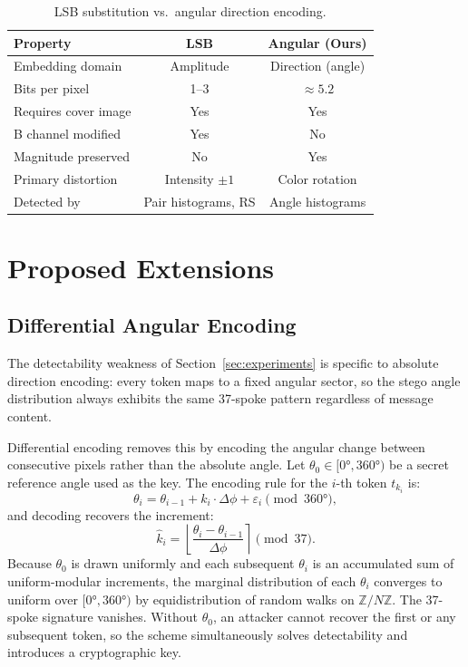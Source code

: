 \documentclass[12pt]{article}
\begin{document}
\begin{table}[H]
    \centering
    \caption{LSB substitution vs.\ angular direction encoding.}
    \label{tab:comparison}
    \begin{tabular}{lcc}
        \toprule
        \textbf{Property} & \textbf{LSB} & \textbf{Angular (Ours)} \\
        \midrule
        Embedding domain        & Amplitude       & Direction (angle) \\
        Bits per pixel          & 1--3            & $\approx 5.2$ \\
        Requires cover image    & Yes             & Yes \\
        B channel modified      & Yes             & No \\
        Magnitude preserved     & No              & Yes \\
        Primary distortion      & Intensity $\pm1$ & Color rotation \\
        Detected by             & Pair histograms, RS & Angle histograms \\
        \bottomrule
    \end{tabular}
\end{table}

\section{Proposed Extensions}
\label{sec:extensions}

\subsection{Differential Angular Encoding}

The detectability weakness of Section~\ref{sec:experiments} is specific to
absolute direction encoding: every token maps to a fixed angular sector, so
the stego angle distribution always exhibits the same 37-spoke pattern
regardless of message content.

Differential encoding removes this by encoding the angular change between
consecutive pixels rather than the absolute angle. Let $\theta_0 \in
[0°, 360°)$ be a secret reference angle used as the key. The encoding rule
for the $i$-th token $t_{k_i}$ is:
\[
    \theta_i = \theta_{i-1} + k_i \cdot \Delta\phi + \varepsilon_i
               \pmod{360°},
\]
and decoding recovers the increment:
\[
    \hat{k}_i = \left\lfloor
        \frac{\theta_i - \theta_{i-1}}{\Delta\phi}
    \right\rceil \pmod{37}.
\]
Because $\theta_0$ is drawn uniformly and each subsequent $\theta_i$ is an
accumulated sum of uniform-modular increments, the marginal distribution of
each $\theta_i$ converges to uniform over $[0°, 360°)$ by equidistribution
of random walks on $\mathbb{Z}/N\mathbb{Z}$. The 37-spoke signature
vanishes. Without $\theta_0$, an attacker cannot recover the first or any
subsequent token, so the scheme simultaneously solves detectability and
introduces a cryptographic key.
\end{document}

